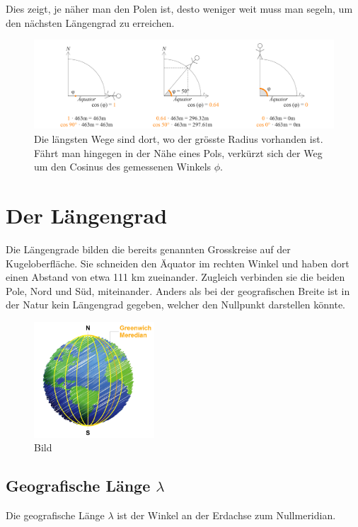 \begin{refsection}
Dies zeigt, je näher man den Polen ist, desto weniger weit muss man segeln, um den nächsten Längengrad zu erreichen.

\begin{figure}[htbp]
\centering
\includegraphics[width=1\textwidth]{kugel/Korrekturbeiwert.jpg}
\caption{Die längsten Wege sind dort, wo der grösste Radius vorhanden ist. Fährt man hingegen in der Nähe eines Pols, verkürzt sich der Weg um den Cosinus des gemessenen Winkels $\phi$.}
\end{figure}

\section{Der Längengrad}
Die Längengrade bilden die bereits genannten Grosskreise auf der Kugeloberfläche.
Sie schneiden den Äquator im rechten Winkel und haben dort einen Abstand von etwa 111 km zueinander. Zugleich verbinden sie die beiden Pole, Nord und Süd, miteinander. Anders als bei der geografischen Breite ist in der Natur kein Längengrad gegeben, welcher den Nullpunkt darstellen könnte.

\begin{figure}[hbtp]
\centering
\includegraphics[width=0.4\textwidth]{kugel/Laengengrad.jpg}
\caption{Bild}
\end{figure}


\subsection{Geografische Länge $\lambda$}
\begin{definition}
Die geografische Länge $\lambda$ ist der Winkel an der Erdachse zum Nullmeridian.
\end{definition}


\end{refsection}
